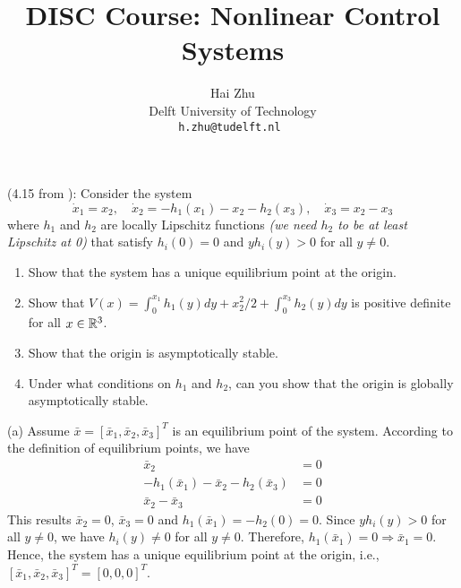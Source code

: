 \documentclass[a4 paper, 12pt]{article}
\title{
        \Large{DISC Course: Nonlinear Control Systems}\\
        \vspace{1em}
        \large\tb{Assignment 1}
}
\author{
        \small Hai Zhu                          \\
        \small Delft University of Technology   \\
        \tt\small h.zhu@tudelft.nl
 }
\date{\small\ti{Monday 5 February 2018}}
\begin{document}
\maketitle


(4.15 from \cite{c1}): Consider the system 
\begin{equation*}
        \dot{x}_1 = x_2, \quad \dot{x}_2 = -h_1(x_1)-x_2-h_2(x_3), \quad \dot{x}_3 = x_2 - x_3
\end{equation*}
where $h_1$ and $h_2$ are locally Lipschitz functions \emph{(we need $h_2$ to be at least Lipschitz at 0)} that satisfy $h_i(0)=0$ and $yh_i(y)>0$ for all $y\neq0$.
\begin{enumerate}[itemsep=1pt, parsep=1pt, label=(\alph*)]
        \item Show that the system has a unique equilibrium point at the origin.
        \item Show that $V(x)=\int_0^{x_1}h_1(y)dy + x_2^2/2 + \int_0^{x_3}h_2(y)dy$ is positive definite for all $x\in\mathbb{R}^3$.
        \item Show that the origin is asymptotically stable.
        \item Under what conditions on $h_1$ and $h_2$, can you show that the origin is globally asymptotically stable.
\end{enumerate}

(a) Assume $\bar{x} = [\bar{x}_1, \bar{x}_2, \bar{x}_3]^T$ is an equilibrium point of the system. According to the definition of equilibrium points, we have
\begin{subequations}
        \begin{alignat}{2}
                \bar{x}_2 &= 0          \\
                -h_1(\bar{x}_1)-\bar{x}_2-h_2(\bar{x}_3) &= 0      \\
                \bar{x}_2 - \bar{x}_3 &= 0
        \end{alignat}
\end{subequations}
This results $\bar{x}_2=0$, $\bar{x}_3=0$ and $h_1(\bar{x}_1)=-h_2(0)=0$. Since $yh_i(y)>0$ for all $y\neq0$, we have $h_i(y)\neq0$ for all $y\neq0$. Therefore, $h_1(\bar{x}_1)=0 \Rightarrow \bar{x}_1 = 0$. Hence, the system has a unique equilibrium point at the origin, i.e., $[\bar{x}_1, \bar{x}_2, \bar{x}_3]^T = [0,0,0]^T$.
\end{document}

